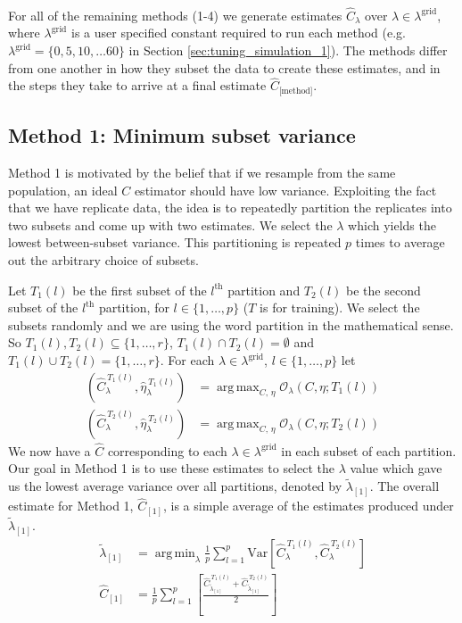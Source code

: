 \documentclass[oupdraft]{bio}
\DeclareMathOperator*{\argmin}{arg\,min}
\DeclareMathOperator*{\argmax}{arg\,max}
\newcommand{\lambdagrid}{\lambda^{\text{grid}}}
\begin{document}
\ \\

For all of the remaining methods (1-4) we generate estimates $\widehat{C}_\lambda$ over $\lambda \in \lambda^{\text{grid}}$, where $\lambdagrid$ is a user specified constant required to run each method (e.g. $\lambdagrid = \{0, 5, 10, \dots 60\}$ in Section \ref{sec:tuning_simulation_1}).  The methods differ from one another in how they subset the data to create these estimates, and in the steps they take to arrive at a final estimate $\widehat{C}_{\text{[method]}}$.

%
%
\subsection{Method 1: Minimum subset variance}
Method 1 is motivated by the belief that if we resample from the same population, an ideal $C$ estimator should have low variance.  Exploiting the fact that we have replicate data, the idea is to repeatedly partition the replicates into two subsets and come up with two estimates.  We select the $\lambda$ which yields the lowest between-subset variance.  This partitioning is repeated $p$ times to average out the arbitrary choice of subsets.

Let $T_1(l)$ be the first subset of the $l^{\text{th}}$ partition and $T_2(l)$ be the second subset of the $l^{\text{th}}$ partition, for $l \in \{1, \dots , p\}$ ($T$ is for training).  We select the subsets randomly and we are using the word partition in the mathematical sense.  So $T_1(l), T_2(l) \subseteq \{1, \dots , r\}$, $T_1(l) \cap T_2(l) = \emptyset$ and $T_1(l) \cup T_2(l) = \{1, \dots ,r\}$.  For each $\lambda \in \lambda^{\text{grid}}$, $l \in \{1, \dots, p\}$ let
\begin{align}
\left(\widehat{C}_{\lambda}^{ \ T_1(l)}, \widehat{\eta}_{\lambda}^{ \ T_1(l)} \right) &= \argmax_{C, \, \eta} \mathcal{O}_\lambda \left(C, \eta; T_1(l) \right) \\
\left(\widehat{C}_{\lambda}^{ \ T_2(l)}, \widehat{\eta}_{\lambda}^{ \ T_2(l)} \right) &= \argmax_{C, \, \eta} \mathcal{O}_\lambda \left(C, \eta; T_2(l) \right)
\end{align}
We now have a $\widehat{C}$ corresponding to each $\lambda \in \lambdagrid$ in each subset of each partition.  Our goal in Method 1 is to use these estimates to select the $\lambda$ value which gave us the lowest average variance over all partitions, denoted by $\widetilde{\lambda}_{[1]}$.  The overall estimate for Method 1, $\widehat{C}_{[1]}$, is a simple average of the estimates produced under $\widetilde{\lambda}_{[1]}$.
\begin{align}
\widetilde{\lambda}_{[1]} &= \argmin_{\lambda} \frac{1}{p} \sum_{l=1}^p \text{Var}\left[ \widehat{C}_{\lambda}^{ \ T_1(l)}, \widehat{C}_{\lambda}^{ \ T_2(l)} \right] \\
\widehat{C}_{[1]} &=  \frac{1}{p} \sum_{l=1}^p \left[ \frac{\widehat{C}_{\widetilde{\lambda}_{[1]}}^{ \ T_1(l)} + \widehat{C}_{\widetilde{\lambda}_{[1]}}^{ \ T_2(l)}}{2} \right]
\end{align}
\end{document}

